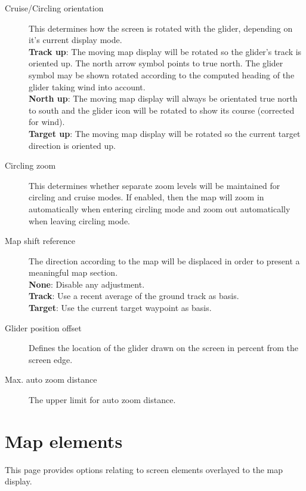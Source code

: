 \begin{description}
\item[Cruise/Circling orientation]  \label{conf:orientation} This determines how
  the screen is rotated with the glider, depending on it's current display mode. \\
  {\bf Track up}: The moving map display will be rotated so the glider's track
  is oriented up. The north arrow symbol points to true north. The glider symbol 
  may be shown rotated according to the computed heading of the glider taking 
  wind into account. \\
  {\bf North up}: The moving map display will always be orientated true north to
  south and the glider icon will be rotated to show its course (corrected for
  wind). \\
  {\bf Target up}: The moving map display will be rotated so the current target
  direction is oriented up.
\item[Circling zoom]  \label{conf:circlingzoom} This determines whether separate
  zoom levels will be maintained for circling and cruise modes.  If enabled, then the 
  map will zoom in automatically when entering circling mode and zoom out
  automatically when leaving circling mode.
\item[Map shift reference]  The direction according to the map will be displaced 
  in order to present a meaningful map section. \\
  {\bf None}: Disable any adjustment. \\
  {\bf Track}: Use a recent average of the ground track as basis. \\
  {\bf Target}: Use the current target waypoint as basis.
\item[Glider position offset]  \label{conf:gliderposition} Defines the location of the 
  glider drawn on the screen in percent from the screen edge.
\item[Max. auto zoom distance]  The upper limit for auto zoom distance.
\end{description}


\clearpage
\section{Map elements}\label{sec:map-elements}

This page provides options relating to screen elements overlayed to the map display.

